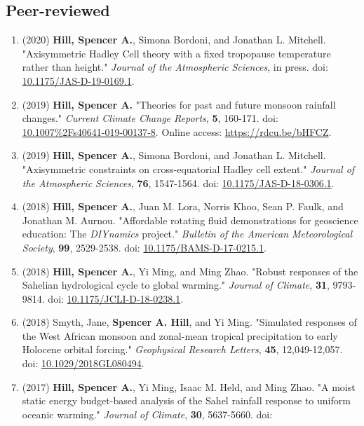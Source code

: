 \documentclass[12pt,letterpaper]{shillcv}
\begin{document}
\subsection*{Peer-reviewed}
\label{sec:org81ec420}
\begin{enumerate}
\item (2020) \textbf{Hill, Spencer A.}, Simona Bordoni, and Jonathan L. Mitchell.
"Axisymmetric Hadley Cell theory with a fixed tropopause temperature rather
than height."  \emph{Journal of the Atmospheric Sciences}, in press.  doi:
\href{https://doi.org/10.1175/JAS-D-19-0169.1}{10.1175/JAS-D-19-0169.1}.
\item (2019) \textbf{Hill, Spencer A.} "Theories for past and future monsoon rainfall
changes."  \emph{Current Climate Change Reports}, \textbf{5}, 160-171.  doi:
\href{https://doi.org/10.1007\%2Fs40641-019-00137-8}{10.1007\%2Fs40641-019-00137-8}.  Online access: \url{https://rdcu.be/bHFCZ}.
\item (2019) \textbf{Hill, Spencer A.}, Simona Bordoni, and Jonathan L. Mitchell.
"Axisymmetric constraints on cross-equatorial Hadley cell extent."
\emph{Journal of the Atmospheric Sciences}, \textbf{76}, 1547-1564.  doi: \href{https://doi.org/10.1175/JAS-D-18-0306.1}{10.1175/JAS-D-18-0306.1}.
\item (2018) \textbf{Hill, Spencer A.}, Juan M. Lora, Norris Khoo, Sean P. Faulk, and
Jonathan M.  Aurnou.  "Affordable rotating fluid demonstrations for
geoscience education: The \emph{DIYnamics} project."  \emph{Bulletin of the
American Meteorological Society}, \textbf{99}, 2529-2538.  doi:
\href{https://doi.org/10.1175/BAMS-D-17-0215.1}{10.1175/BAMS-D-17-0215.1}.
\item (2018) \textbf{Hill, Spencer A.}, Yi Ming, and Ming Zhao.  "Robust responses of the
Sahelian hydrological cycle to global warming."  \emph{Journal of
Climate}, \textbf{31}, 9793-9814.  doi: \href{https://doi.org/10.1175/JCLI-D-18-0238.1}{10.1175/JCLI-D-18-0238.1}.
\item (2018) Smyth, Jane, \textbf{Spencer A. Hill}, and Yi Ming.  "Simulated responses of
the West African monsoon and zonal-mean tropical precipitation to early
Holocene orbital forcing."  \emph{Geophysical Research Letters}, \textbf{45},
12,049-12,057.  doi: \href{https://doi.org/10.1029/2018GL080494}{10.1029/2018GL080494}.
\item (2017) \textbf{Hill, Spencer A.}, Yi Ming, Isaac M. Held, and Ming Zhao.  "A moist
static energy budget-based analysis of the Sahel rainfall response to uniform
oceanic warming."  \emph{Journal of Climate}, \textbf{30}, 5637-5660.  doi:

\end{enumerate}
\end{document}

